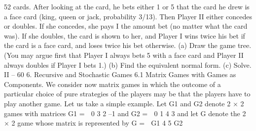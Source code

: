 52 cards. After looking at the card, he bets either 1 or 5 that the card he drew is a face
card (king, queen or jack, probability 3/13). Then Player II either concedes or doubles. If
she concedes, she pays I the amount bet (no matter what the card was). If she doubles,
the card is shown to her, and Player I wins twice his bet if the card is a face card, and
loses twice his bet otherwise.
(a) Draw the game tree. (You may argue first that Player I always bets 5 with a face card
and Player II always doubles if Player I bets 1.)
(b) Find the equivalent normal form.
(c) Solve.
II – 60
6. Recursive and Stochastic Games
6.1 Matrix Games with Games as Components. We consider now matrix games
in which the outcome of a particular choice of pure strategies of the players may be that
the players have to play another game. Let us take a simple example.
Let G1 and G2 denote 2 × 2 games with matrices
G1 =
 0 3
2 –1
and G2 =
 0 1
4 3
and let G denote the 2 × 2 game whose matrix is represented by
G =
 G1 4
5 G2

